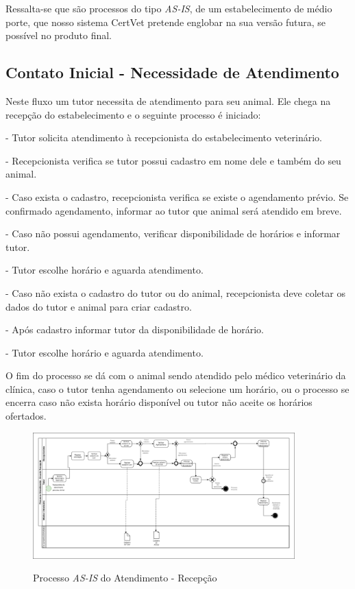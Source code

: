 \documentclass[
    12pt,               %
    openright,          %
    oneside,
    a4paper,            %
    BIBLATEX,           %
    TODO,               %
    english,            %
    brazil              %
    ]{ifsp-spo-inf-ctds}
\begin{document}
    Ressalta-se que são processos do tipo \emph{AS-IS}, de um estabelecimento de médio porte, que nosso sistema CertVet pretende englobar na sua versão futura, se possível no produto final.

    \subsection{Contato Inicial - Necessidade de Atendimento}
    
     Neste fluxo um tutor necessita de atendimento para seu animal. Ele chega na recepção do estabelecimento e o seguinte processo é iniciado:
     
      - Tutor solicita atendimento à recepcionista do estabelecimento veterinário.
      
      - Recepcionista verifica se tutor possui cadastro em nome dele e também do seu animal.
      
      - Caso exista o cadastro, recepcionista verifica se existe o agendamento prévio. Se confirmado agendamento, informar ao tutor que animal será atendido em breve.
      
      - Caso não possui agendamento, verificar disponibilidade de horários e informar tutor.
      
      - Tutor escolhe horário e aguarda atendimento.
      
      - Caso não exista o cadastro do tutor ou do animal, recepcionista deve coletar os dados do tutor e animal para criar cadastro.
      
      - Após cadastro informar tutor da disponibilidade de horário.
      
      - Tutor escolhe horário e aguarda atendimento.


    O fim do processo se dá com o animal sendo atendido pelo médico veterinário da clínica, caso o tutor tenha agendamento ou selecione um horário, ou o processo se encerra caso não exista horário disponível ou tutor não aceite os horários ofertados.



    \begin{figure}
        \centering
         \caption{Processo \emph{AS-IS} do Atendimento - Recepção}
        \includegraphics[width=0.9\textwidth]{images/fluxo de atendimento-rec.png}
        \label{fluxo-rec}
    \end{figure}  
\end{document}
